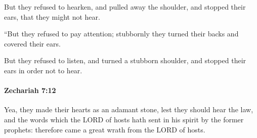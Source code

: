 			\begin{versebox}
					\item[BHS] 
					\item[LXX] 
					\item[ASV] But they refused to hearken, and pulled away the shoulder, and stopped their ears, that they might not hear.
					\item[NIV] “But they refused to pay attention; stubbornly they turned their backs and covered their ears.
					\item[NRSV] But they refused to listen, and turned a stubborn shoulder, and stopped their ears in order not to hear.
			\end{versebox}

		\paragraph{Zechariah 7:12} %
			\label{ZECHARIAH-7-12}

			Yea, they made their hearts as an adamant stone, lest they should hear the law, and the words which the LORD of hosts hath sent in his spirit by the former prophets: therefore came a great wrath from the LORD of hosts.

